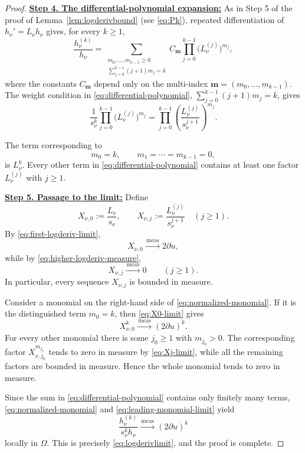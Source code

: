 \documentclass[12pt,letterpaper,reqno]{amsart}
\theoremstyle{definition}
\numberwithin{equation}{section}
\newcommand{\convmeas}{\xrightarrow{\,\mathrm{meas}\,}}
\begin{document}
\begin{proof}
\medskip\noindent
\textbf{\underline{Step 4. The differential-polynomial expansion:}}
As in Step 5 of the proof of Lemma~\ref{lem:logderivbound}
(see \eqref{eq:Pk}), repeated differentiation of
$
h_\nu'=L_\nu h_\nu
$
gives, for every \(k\geq1\),
\begin{equation}\label{eq:differential-polynomial}
 \frac{h_\nu^{(k)}}{h_\nu}
 =
 \sum_{\substack{m_0,\ldots,m_{k-1}\ge0\\
                  \sum_{j=0}^{k-1}(j+1)m_j=k}}
 C_{\mathbf m}
 \prod_{j=0}^{k-1}
 \bigl(L_\nu^{(j)}\bigr)^{m_j},
\end{equation}
where the constants \(C_{\mathbf m}\) depend only on the multi-index
$
\mathbf m=(m_0,\ldots,m_{k-1}).
$
The weight condition in \eqref{eq:differential-polynomial},
\(\sum_{j=0}^{k-1}(j+1)m_j=k\), gives
\begin{equation}\label{eq:normalized-monomial}
 \frac1{s_\nu^k}
 \prod_{j=0}^{k-1}
 \bigl(L_\nu^{(j)}\bigr)^{m_j}
 =
 \prod_{j=0}^{k-1}
 \left(
 \frac{L_\nu^{(j)}}{s_\nu^{j+1}}
 \right)^{m_j}.
\end{equation}

The term corresponding to
\[
m_0=k,
\qquad
m_1=\cdots=m_{k-1}=0,
\]
is \(L_\nu^k\). Every other term in
\eqref{eq:differential-polynomial} contains at least one factor
\(L_\nu^{(j)}\) with \(j\geq1\).

\medskip\noindent
\textbf{\underline{Step 5. Passage to the limit:}}
Define
\[
X_{\nu,0}:=\frac{L_\nu}{s_\nu},
\qquad
X_{\nu,j}
 :=
 \frac{L_\nu^{(j)}}{s_\nu^{j+1}}
 \quad(j\geq1).
\]
By \eqref{eq:first-logderiv-limit},
\begin{equation}\label{eq:X0-limit}
 X_{\nu,0}
 \convmeas
 2\partial u,
\end{equation}
while by \eqref{eq:higher-logderiv-measure},
\begin{equation}\label{eq:Xj-limit}
 X_{\nu,j}\convmeas0
 \qquad(j\geq1).
\end{equation}
In particular, every sequence \(X_{\nu,j}\) is bounded in measure.

Consider a monomial on the right-hand side of
\eqref{eq:normalized-monomial}. If it is the distinguished term
\(m_0=k\), then \eqref{eq:X0-limit} gives
\begin{equation}\label{eq:leading-monomial-limit}
 X_{\nu,0}^k
 \convmeas
 (2\partial u)^k.
\end{equation}
For every other monomial there is some \(j_0\geq1\) with
\(m_{j_0}>0\). The corresponding factor
\(X_{\nu,j_0}^{m_{j_0}}\) tends to zero in measure by
\eqref{eq:Xj-limit}, while all the remaining factors are bounded in
measure. Hence the whole monomial tends to zero in measure.

Since the sum in \eqref{eq:differential-polynomial} contains only
finitely many terms, \eqref{eq:normalized-monomial} and
\eqref{eq:leading-monomial-limit} yield
\[
 \frac{h_\nu^{(k)}}{s_\nu^kh_\nu}
 \convmeas
 (2\partial u)^k
\]
locally in \(\Omega\). This is precisely
\eqref{eq:logderivlimit}, and the proof is complete.
\end{proof}
\end{document}
